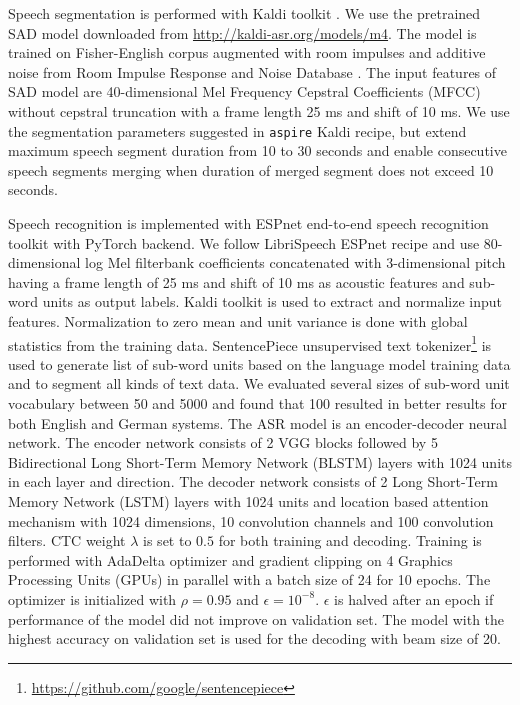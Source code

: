 \documentclass[12pt,a4paper]{article}
\begin{document}
Speech segmentation is performed with Kaldi toolkit \cite{povey2011kaldi}.
We use the pretrained SAD model downloaded from \url{http://kaldi-asr.org/models/m4}.
The model is trained on Fisher-English corpus \cite{cieri2004fisher}
augmented with room impulses and additive noise from
Room Impulse Response and Noise Database \cite{ko2017study}.
The input features of SAD model
are 40-dimensional Mel Frequency Cepstral Coefficients (MFCC) without cepstral truncation
with a frame length 25 ms and shift of 10 ms.
We use the segmentation parameters suggested in 
\texttt{aspire} Kaldi recipe, but extend maximum speech segment duration
from 10 to 30 seconds and enable consecutive speech segments merging
when duration of merged segment does not exceed 10 seconds.

Speech recognition is implemented with ESPnet end-to-end
speech recognition toolkit \cite{watanabe2018espnet}
with PyTorch backend.
We follow LibriSpeech ESPnet recipe and use 
80-dimensional log Mel filterbank coefficients concatenated with
3-dimensional pitch having a frame length of 25 ms and shift of 10 ms as acoustic features
and sub-word units as output labels. 
Kaldi toolkit is used to extract and normalize input features.
Normalization
to zero mean and unit variance is done with
global statistics from the training data.
SentencePiece unsupervised text tokenizer\footnote{\url{https://github.com/google/sentencepiece}} is used to
generate list of sub-word units based on the
language model training data and to segment all kinds of text data.
We evaluated several sizes of sub-word unit vocabulary
between 50 and 5000 and found that 100 resulted in better
results for both English and German systems.
The ASR model is an encoder-decoder neural network.
The encoder network consists of 2 VGG \cite{simonyan2014very} blocks followed by
5 Bidirectional Long Short-Term Memory Network (BLSTM) layers \cite{graves2005bidirectional} with 1024 units in each layer and direction.
The decoder network consists of 2 Long Short-Term Memory Network (LSTM) \cite{hochreiter1997long} layers with 1024 units
and location based attention mechanism with 1024 dimensions,
10 convolution channels and 100 convolution filters.
CTC weight $\lambda$ is set to $0.5$ for both training
and decoding.
Training is performed with AdaDelta optimizer \cite{zeiler2012adadelta}
and gradient clipping on 4 Graphics Processing Units (GPUs) in parallel with a batch size of 24 for 10 epochs.
The optimizer is initialized with $\rho = 0.95$ and $\epsilon = 10^{-8}$.
$\epsilon$ is halved after an epoch if performance of the model
did not improve on validation set.
The model with the highest accuracy on validation set
is used for the decoding with beam size of 20. 
\end{document}
